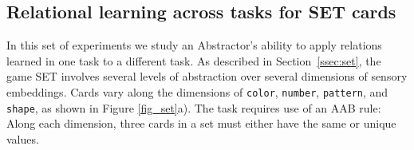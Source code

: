 \subsection{Relational learning across tasks for SET cards}
\label{ssec:set_exp}
\def\attr#1{{\small\texttt{#1}}}
\def\mattr#1{{\mbox{\footnotesize\texttt{#1}}}}

In this set of experiments we study
an Abstractor's ability to apply relations learned in one task to a different task.
As described in Section~\ref{ssec:set}, the game SET involves several levels of abstraction
over several dimensions
of sensory embeddings. Cards vary along the dimensions of \attr{color}, \attr{number}, \attr{pattern}, and
\attr{shape}, as shown in Figure \ref{fig_set}a). The task requires use of an AAB rule:
Along each dimension, three cards in a set must either have the same or unique values. 

